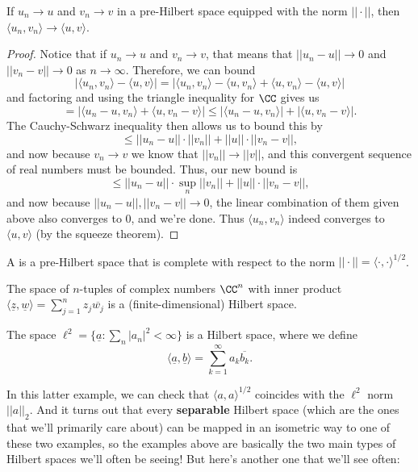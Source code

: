 \begin{theorem}
If $u_n \to u$ and $v_n \to v$ in a pre-Hilbert space equipped with the norm $||\cdot||$, then $\langle u_n, v_n \rangle \to \langle u, v \rangle$.
\end{theorem}
\begin{proof}
Notice that if $u_n \to u$ and $v_n \to v$, that means that $||u_n - u|| \to 0$ and $||v_n - v|| \to 0$ as $n \to \infty$. Therefore, we can bound
\[
    |\langle u_n, v_n \rangle - \langle u, v \rangle| = |\langle u_n, v_n \rangle - \langle u, v_n \rangle + \langle u, v_n \rangle - \langle u, v \rangle|
\]
and factoring and using the triangle inequality for $\CC$ gives us 
\[
    = |\langle u_n - u, v_n \rangle + \langle u, v_n - v \rangle| \le  |\langle u_n - u, v_n \rangle| + |\langle u, v_n - v \rangle|.
\]
The Cauchy-Schwarz inequality then allows us to bound this by 
\[
    \le ||u_n - u|| \cdot ||v_n|| + ||u|| \cdot ||v_n - v||,
\]
and now because $v_n \to v$ we know that $||v_n|| \to ||v||$, and this convergent sequence of real numbers must be bounded. Thus, our new bound is 
\[
    \le ||u_n - u|| \cdot \sup_n||v_n|| + ||u|| \cdot ||v_n - v||,
\]
and now because $||u_n - u||, ||v_n - v|| \to 0$, the linear combination of them given above also converges to $0$, and we're done. Thus $\langle u_n, v_n \rangle$ indeed converges to $\langle u, v \rangle$ (by the squeeze theorem).
\end{proof}

\begin{definition}
A  is a pre-Hilbert space that is complete with respect to the norm $||\cdot|| = \langle \cdot, \cdot \rangle^{1/2}$.
\end{definition}

\begin{example}
The space of $n$-tuples of complex numbers $\CC^n$ with inner product $\langle \underline{z}, \underline{w} \rangle = \sum_{j=1}^n z_j \overline{w_j}$ is a (finite-dimensional) Hilbert space.
\end{example}

\begin{example}
The space $\ell^2 = \{\underline{a}: \sum_{n} |a_n|^2 < \infty\}$ is a Hilbert space, where we define 
\[
    \langle \underline{a}, \underline{b} \rangle = \sum_{k=1}^{\infty} a_k \overline{b_k}.
\]
\end{example}

In this latter example, we can check that $\langle a, a \rangle^{1/2}$ coincides with the $\ell^2$ norm $||a||_2$. And it turns out that every \textbf{separable} Hilbert space (which are the ones that we'll primarily care about) can be mapped in an isometric way to one of these two examples, so the examples above are basically the two main types of Hilbert spaces we'll often be seeing! But here's another one that we'll see often:

